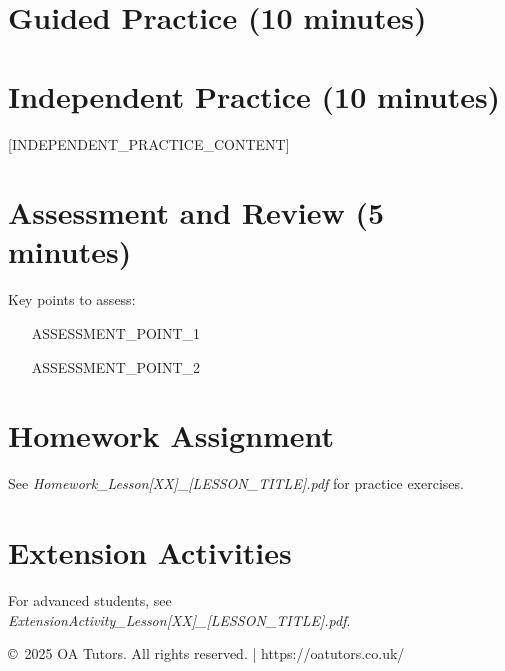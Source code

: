 \documentclass[a4paper,12pt]{article}
\begin{document}
\section{Guided Practice (10 minutes)}
\begin{activity}
\end{activity}

\section{Independent Practice (10 minutes)}
[INDEPENDENT_PRACTICE_CONTENT]

\section{Assessment and Review (5 minutes)}
\begin{note}
Key points to assess:
\begin{itemize}
    \item [ASSESSMENT_POINT_1]
    \item [ASSESSMENT_POINT_2]
\end{itemize}
\end{note}

\section{Homework Assignment}
See \textit{Homework\_Lesson[XX]\_[LESSON_TITLE].pdf} for practice exercises.

\section{Extension Activities}
For advanced students, see \textit{ExtensionActivity\_Lesson[XX]\_[LESSON_TITLE].pdf}.

\vfill
\begin{center}
\textcolor{oagray}{\small \copyright\ 2025 OA Tutors. All rights reserved. | https://oatutors.co.uk/}
\end{center}
\end{document}
